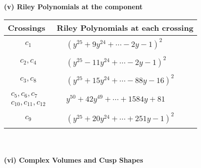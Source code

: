 \documentclass[1p]{elsarticle_modified}
\theoremstyle{definition}
\begin{document}
\newpage\renewcommand{\arraystretch}{1}
\flushleft \textbf{(v) Riley Polynomials at the component}\newline \\
\begin{tabular}{m{50pt}|m{274pt}}
Crossings & \hspace{64pt}Riley Polynomials at each crossing \\
\hline $$\begin{aligned}c_{1}\end{aligned}$$&$\begin{aligned}
&(y^{25}+9 y^{24}+\cdots-2 y-1)^{2}
\end{aligned}$\\
\hline $$\begin{aligned}c_{2},c_{4}\end{aligned}$$&$\begin{aligned}
&(y^{25}-11 y^{24}+\cdots-2 y-1)^{2}
\end{aligned}$\\
\hline $$\begin{aligned}c_{3},c_{8}\end{aligned}$$&$\begin{aligned}
&(y^{25}+15 y^{24}+\cdots-88 y-16)^{2}
\end{aligned}$\\
\hline $$\begin{aligned}c_{5},c_{6},c_{7}\\c_{10},c_{11},c_{12}\end{aligned}$$&$\begin{aligned}
&y^{50}+42 y^{49}+\cdots+1584 y+81
\end{aligned}$\\
\hline $$\begin{aligned}c_{9}\end{aligned}$$&$\begin{aligned}
&(y^{25}+20 y^{24}+\cdots+251 y-1)^{2}
\end{aligned}$\\
\hline
\end{tabular}\\~\\
\newpage\flushleft \textbf{(vi) Complex Volumes and Cusp Shapes}
\end{document}
